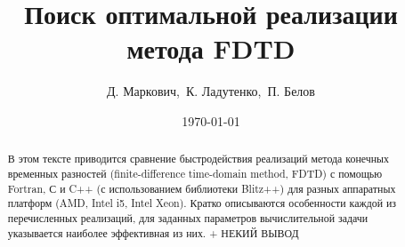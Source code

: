 \documentclass[10pt]{article}
\author{Д. Маркович,~К. Ладутенко,~П. Белов}
\title{Поиск оптимальной реализации метода FDTD}
\date{\today}
\begin{document}
\maketitle
\renewcommand{\abstractname}{}
\begin{abstract}
  В этом тексте приводится сравнение быстродействия реализаций
  метода конечных временных разностей (finite-difference time-domain
  method, FDTD) с помощью Fortran, С и C++ (с использованием
  библиотеки Blitz++) для разных аппаратных платформ (AMD, Intel i5,
  Intel Xeon). Кратко описываются особенности каждой из 
  перечисленных реализаций, для заданных параметров вычислительной задачи 
  указывается наиболее эффективная из них. + НЕКИЙ ВЫВОД
\end{abstract}
\renewcommand{\contentsname}{Содержание}
\end{document}
